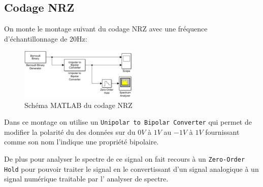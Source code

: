\documentclass[11pt, openright]{book}
\begin{document}
\subsection{Codage NRZ}

On monte le montage suivant du codage NRZ avec une fréquence d'échantillonnage de 20Hz:

\begin{figure}[ht!]
	\centering
	\includegraphics[width=0.5\textwidth]{./object/g3.png}
	\caption{Schéma MATLAB du codage NRZ}
\end{figure}

Dans ce montage on utilise un \texttt{Unipolar to Bipolar Converter} qui permet de modifier la polarité du des données sur du $0V$ à $1V$ au $-1V$ à $1V$ fournissant comme son nom l'indique une propriété bipolaire.

De plus pour analyser le spectre de ce signal on fait recours à un \texttt{Zero-Order Hold} pour pouvoir traiter le signal en le convertissant d'un signal analogique à un signal numérique traitable par l' analyser de spectre.

\begin{figure}[ht!]
	\begin{floatrow}


	\end{floatrow}
\end{figure}
\end{document}
